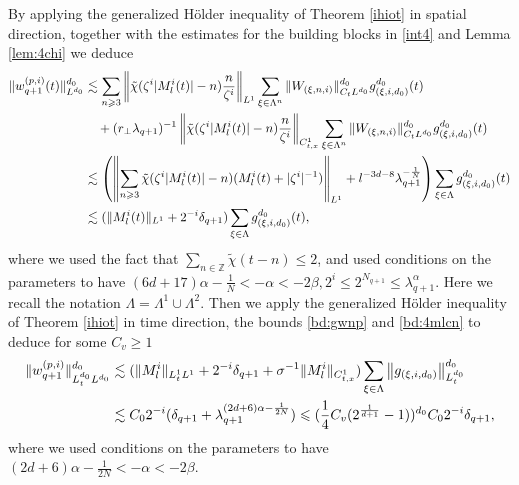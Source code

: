 \documentclass[10pt,a4paper]{amsart}
\numberwithin{equation}{section}
\newcommand{\norm}[1]{\left\|#1\right\|}
\def\geq{\geqslant}
\def\leq{\leqslant}
\def\geq{\geqslant}
\def\leq{\leqslant}
\begin{document}
By applying the generalized H\"older inequality of 
Theorem \ref{ihiot} in spatial direction, together with the estimates for the building blocks in \eqref{int4} and Lemma \ref{lem:4chi} we deduce 
\begin{align}
\|w_{q+1}^{(p,i)}(t)\|^{d_0}_{L^{d_0}}%
&\lesssim\sum_{n\geq3}\norm{\tilde{\chi}(\zeta^{i}|M^{i}_l(t)|-n)\frac{n}{\zeta^{i}}}_{L^1}\sum_{\xi\in\Lambda^{n}}\|W_{(\xi,n,i)}\|_{C_tL^{d_0}}^{d_0}g_{(\xi,i,d_0)}^{d_0}(t)\notag\\ 
&\quad+(r_\perp\lambda_{q+1})^{-1}\norm{\tilde{\chi}(\zeta^{i}|M^{i}_l(t)|-n)\frac{n}{\zeta^{i}}}_{C_{t,x}^1}\sum_{\xi\in\Lambda^{n}}\|W_{(\xi,n,i)}\|_{C_tL^{d_0}}^{d_0}g_{(\xi,i,d_0)}^{d_0}(t)\notag\\
&\lesssim\left(\norm{\sum_{n\geq3}\tilde{\chi}(\zeta^{i}|M^{i}_l(t)|-n)(M^{i}_l(t)+|\zeta^{i}|^{-1}
)}_{L^1}+l^{-3d-8}\lambda_{q+1}^{-\frac{1}{N}}\right)\sum_{\xi\in\Lambda}g_{(\xi,i,d_0)}^{d_0}(t)\notag\\
&\lesssim (\|M^{i}_l(t)\|_{L^1}+2^{-i}\delta_{q+1})\sum_{\xi\in\Lambda}g_{(\xi,i,d_0)}^{d_0}(t)
,\notag
\end{align}
where we used   the fact that $\sum_{n\in\mathbb{Z}} \tilde{\chi}(t - n) \leq2$, and used conditions on the parameters to have $(6d+17)\alpha-\frac{1}{N}<-\alpha<-2\beta,2^{i}\leq 2^{N_{q+1}}\leq \lambda_{q+1}^{\alpha}$. Here we recall the notation $\Lambda=\Lambda^{1}\cup\Lambda^{2}$.
Then we apply the generalized H\"older inequality of Theorem \ref{ihiot} in time direction, the bounds \eqref{bd:gwnp} and \eqref{bd:4mlcn} to deduce  for some ${C}_v\geq1$
\begin{align}
\|w_{q+1}^{(p,i)}\|_{L^{d_0}_tL^{d_0}}^{d_0}&\lesssim (\|M^{i}_l\|_{L^1_tL^1}+2^{-i}\delta_{q+1}+\sigma^{-1}\|M^{i}_l\|_{C_{t,x}^1})\sum_{\xi\in\Lambda}\norm{g_{(\xi,i,d_0)}}^{d_0}_{L_t^{d_0}}
\notag\\
    &\lesssim C_02^{-i}(\delta_{q+1}+\lambda_{q+1}^{(2d+6)\alpha-\frac{1}{2N}})\leq (\frac14 C_v(2^{\frac1{d+1}}-1))^{d_0}C_02^{-i}\delta_{q+1},\label{bd:4wq+1pl2}
\end{align}
where we used  conditions on the parameters to have $(2d+6)\alpha-\frac{1}{2N}<-\alpha<-2\beta$.
\end{document}
